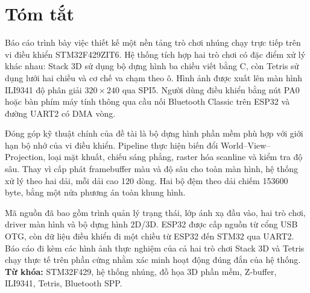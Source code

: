 \chapter*{Tóm tắt}

Báo cáo trình bày việc thiết kế một nền tảng trò chơi nhúng chạy trực tiếp trên vi điều khiển STM32F429ZIT6. Hệ thống tích hợp hai trò chơi có đặc điểm xử lý khác nhau: Stack 3D sử dụng bộ dựng hình ba chiều viết bằng C, còn Tetris sử dụng lưới hai chiều và cơ chế va chạm theo ô. Hình ảnh được xuất lên màn hình ILI9341 độ phân giải $320\times240$ qua SPI5. Người dùng điều khiển bằng nút PA0 hoặc bàn phím máy tính thông qua cầu nối Bluetooth Classic trên ESP32 và đường UART2 có DMA vòng.

Đóng góp kỹ thuật chính của đề tài là bộ dựng hình phần mềm phù hợp với giới hạn bộ nhớ của vi điều khiển. Pipeline thực hiện biến đổi World--View--Projection, loại mặt khuất, chiếu sáng phẳng, raster hóa scanline và kiểm tra độ sâu. Thay vì cấp phát framebuffer màu và độ sâu cho toàn màn hình, hệ thống xử lý theo hai dải, mỗi dải cao 120 dòng. Hai bộ đệm theo dải chiếm 153600 byte, bằng một nửa phương án toàn khung hình.

Mã nguồn đã bao gồm trình quản lý trạng thái, lớp ánh xạ đầu vào, hai trò chơi, driver màn hình và bộ dựng hình 2D/3D. ESP32 được cấp nguồn từ cổng USB OTG, còn dữ liệu điều khiển đi một chiều từ ESP32 đến STM32 qua UART2. Báo cáo đi kèm các hình ảnh thực nghiệm của cả hai trò chơi Stack 3D và Tetris chạy thực tế trên phần cứng nhằm xác minh hoạt động đúng đắn của hệ thống.
\noindent\textbf{Từ khóa:} STM32F429, hệ thống nhúng, đồ họa 3D phần mềm, Z-buffer, ILI9341, Tetris, Bluetooth SPP.
\clearpage
